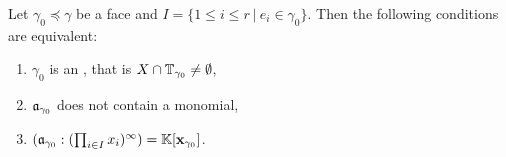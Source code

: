 \begin{prop}
	\label{prop:aface_equivalence}
	Let $\gamma_0\preceq\gamma$ be a face and $I= \{1\leq i\leq r\ |\ e_i\in\gamma_0\}$. Then the following conditions are equivalent:
	\begin{enumerate}[label={\upshape(\roman*)}]
		\item $\gamma_0$ is an \aface{}, that is $X\cap \mathbb{T}_{\gamma_0} \neq \emptyset$,
		\label{enum_item:aface_equivalence_aface}
		\item $\mathfrak{a}_{\gamma_0}$ does not contain a monomial,
		\label{enum_item:aface_equivalence_monomial}
		\item $(\mathfrak{a}_{\gamma_0} : (\prod_{i\in I} x_i)^\infty) = \mathbb{K}[\mathbf{x}_{\gamma_0}]$.
		\label{enum_item:aface_equivalence_saturation}
	\end{enumerate}
\end{prop}
